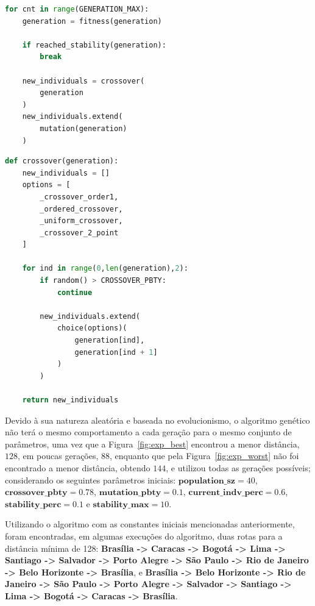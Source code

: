 \begin{lstlisting}[float, floatplacement=H, caption={Trecho da implementação das etapas do algoritmo genético.}, label={cod:etapas}, language=Python]
for cnt in range(GENERATION_MAX):
    generation = fitness(generation)

    if reached_stability(generation):
        break

    new_individuals = crossover(
        generation
    )
    new_individuals.extend(
        mutation(generation)
    )
\end{lstlisting}

\begin{lstlisting}[float, floatplacement=H, caption={Combinação de dois cromossomos.}, label={cod:combinacao}, language=Python]
def crossover(generation):
    new_individuals = []
    options = [
        _crossover_order1,
        _ordered_crossover,
        _uniform_crossover,
        _crossover_2_point
    ]
    
    for ind in range(0,len(generation),2):
        if random() > CROSSOVER_PBTY:
            continue
    
        new_individuals.extend(
            choice(options)(
                generation[ind],
                generation[ind + 1]
            )
        )
    
    return new_individuals
\end{lstlisting}

Devido à sua natureza aleatória e baseada no evolucionismo, o algoritmo genético não terá o mesmo comportamento a cada geração para o mesmo conjunto de parâmetros, uma vez que a Figura~\ref{fig:exp_best} encontrou a menor distância, $128$, em poucas gerações, $88$, enquanto que pela Figura~\ref{fig:exp_worst} não foi encontrado a menor distância, obtendo $144$, e utilizou todas as gerações possíveis; considerando os seguintes parâmetros iniciais: $\mathbf{population\_sz}=40$, $\mathbf{crossover\_pbty}=0.78$, $\mathbf{mutation\_pbty}=0.1$, $\mathbf{current\_indv\_perc}=0.6$, $\mathbf{stability\_perc}=0.1$ e $\mathbf{stability\_max}=10$.

Utilizando o algoritmo com as constantes iniciais mencionadas anteriormente, foram encontradas, em algumas execuções do algoritmo, duas rotas para a distância mínima de 128: \textbf{Brasília -> Caracas -> Bogotá -> Lima -> Santiago -> Salvador -> Porto Alegre -> São Paulo -> Rio de Janeiro -> Belo Horizonte -> Brasília}, e \textbf{Brasília -> Belo Horizonte -> Rio de Janeiro -> São Paulo -> Porto Alegre -> Salvador -> Santiago -> Lima -> Bogotá -> Caracas -> Brasília}.

